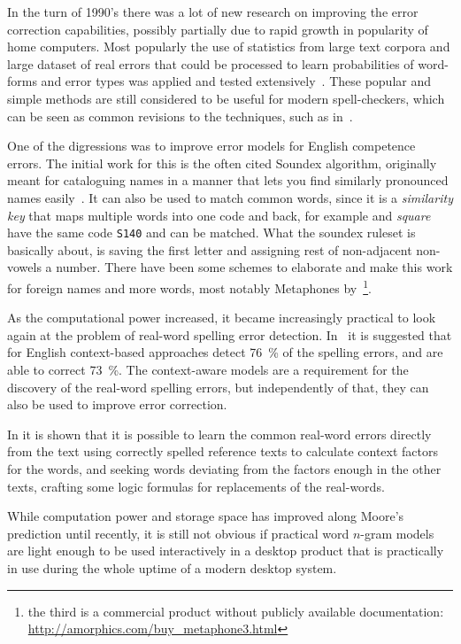 \documentclass[officiallayout]{unihelcompling}
\newcommand\misspelt{\bgroup\markoverwith
{\textcolor{red}{\lower3.5pt\hbox{\sixly \char58}}}\ULon}
\begin{document}
In the turn of 1990's there was a lot of new research on improving the error
correction capabilities, possibly partially due to rapid growth in popularity
of home computers. Most popularly the use of statistics from large text corpora
and large dataset of real errors that could be processed to learn probabilities
of word-forms and error types was applied and tested
extensively~\citep{kernighan1990spelling,church1991probability}. These popular
and simple methods are still considered to be useful for modern spell-checkers,
which can be seen as common revisions to the techniques, such as
in~\citet{brill2000improved}.

One of the digressions was to improve error models for English competence
errors. The initial work for this is the often cited Soundex algorithm,
originally meant for cataloguing names in a manner that lets you find similarly
pronounced names easily~\citep{russell1918soundex}. It can also be used to
match common words, since it is a \emph{similarity key} that maps multiple
words into one code and back, for example \misspelt{squer} and \emph{square}
have the same code \texttt{S140} and can be matched. What the soundex ruleset
is basically about, is saving the first letter and assigning rest of
non-adjacent non-vowels a number. There have been some schemes to elaborate and
make this work for foreign names and more words, most notably Metaphones
by~\citet{philips1990hanging,philips2000double}\footnote{the third is a
commercial product without publicly available documentation:
\url{http://amorphics.com/buy_metaphone3.html}}.

As the computational power increased, it became increasingly practical to look
again at the problem of real-word spelling error detection.
In~\citet{mays1991context} it is suggested that for English context-based
approaches detect 76~\% of the spelling errors, and are able to correct 73~\%.
The context-aware models are a requirement for the discovery of the real-word
spelling errors, but independently of that, they can also be used to improve
error correction. 

In \citet{al2006learning} it is shown that it is possible to learn the common
real-word errors directly from the text using correctly spelled reference texts
to calculate context factors for the words, and seeking words deviating from
the factors enough in the other texts, crafting some logic formulas for
replacements of the real-words.

While computation power and storage space has improved along Moore's
prediction until recently, it is still not obvious if practical word \(n\)-gram
models are light enough to be used interactively in a desktop product that is
practically in use during the whole uptime of a modern desktop system.
\end{document}
